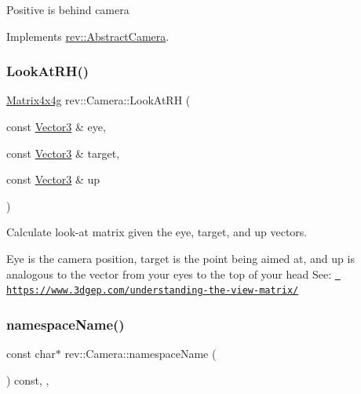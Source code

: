 Positive is behind camera 

Implements \mbox{\hyperlink{classrev_1_1_abstract_camera_aad3a00ed805121a7915574b4125a343f}{rev\+::\+Abstract\+Camera}}.

\mbox{\label{classrev_1_1_camera_ad9413f1b412112c657cb6e58f7fed60f}} 
\subsubsection{\texorpdfstring{LookAtRH()}{LookAtRH()}}
{\footnotesize\ttfamily \mbox{\hyperlink{classrev_1_1_square_matrix}{Matrix4x4g}} rev\+::\+Camera\+::\+Look\+At\+RH (\begin{DoxyParamCaption}\item[{const \mbox{\hyperlink{classrev_1_1_vector}{Vector3}} \&}]{eye,  }\item[{const \mbox{\hyperlink{classrev_1_1_vector}{Vector3}} \&}]{target,  }\item[{const \mbox{\hyperlink{classrev_1_1_vector}{Vector3}} \&}]{up }\end{DoxyParamCaption})\hspace{0.3cm}{\ttfamily [static]}}



Calculate look-\/at matrix given the eye, target, and up vectors. 

Eye is the camera position, target is the point being aimed at, and up is analogous to the vector from your eyes to the top of your head See\+: \href{https://www.3dgep.com/understanding-the-view-matrix/}{\texttt{ https\+://www.\+3dgep.\+com/understanding-\/the-\/view-\/matrix/}} \mbox{\label{classrev_1_1_camera_afd16ba4c2ca04aa0a4945c9aca16606d}} 
\subsubsection{\texorpdfstring{namespaceName()}{namespaceName()}}
{\footnotesize\ttfamily const char$\ast$ rev\+::\+Camera\+::namespace\+Name (\begin{DoxyParamCaption}{ }\end{DoxyParamCaption}) const\hspace{0.3cm}{\ttfamily [inline]}, {\ttfamily [override]}, {\ttfamily [virtual]}}




